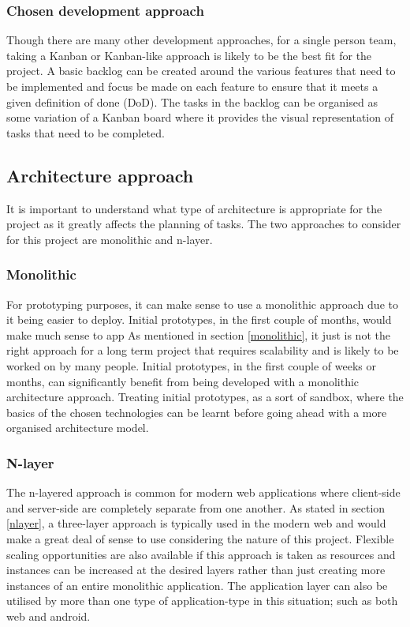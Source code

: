 \subsubsection*{Chosen development approach}
Though there are many other development approaches, for a single person team, taking a Kanban or Kanban-like approach is likely to be the best
fit for the project.
A basic backlog can be created around the various features that need to be implemented and focus be made on each feature to ensure
that it meets a given definition of done (DoD). 
The tasks in the backlog can be organised as some variation of a Kanban board where it provides the visual representation of tasks that need to be
completed. 

\subsection{Architecture approach}
It is important to understand what type of architecture is appropriate for the project as it greatly affects the planning of tasks.
The two approaches to consider for this project are monolithic and n-layer.

\subsubsection*{Monolithic}
For prototyping purposes, it can make sense to use a monolithic approach due to it being easier to deploy.
Initial prototypes, in the first couple of months, would make much sense to app
As mentioned in section \ref{monolithic}, it just is not the right approach for a long term project that requires scalability and is likely
to be worked on by many people.
Initial prototypes, in the first couple of weeks or months, can significantly benefit from being developed with a monolithic architecture approach.
Treating initial prototypes, as a sort of sandbox, where the basics of the chosen technologies can be learnt before going
ahead with a more organised architecture model.

\subsubsection*{N-layer}
The n-layered approach is common for modern web applications where client-side and server-side are completely separate
from one another. As stated in section \ref{nlayer}, a three-layer approach is typically used in the modern web and would make a great
deal of sense to use considering the nature of this project.
Flexible scaling opportunities are also available if this approach is taken as resources and instances can be increased at the desired
layers rather than just creating more instances of an entire monolithic application.
The application layer can also be utilised by more than one type of application-type in this situation; such as both web and android.
 

